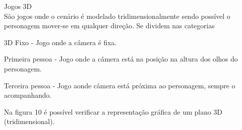 \begin{figure}[h!]
		\centering
	\end{figure}
	\pagebreak
\begin{alineascomponto}

\item Jogos 3D\\
São jogos onde o cenário é modelado tridimensionalmente sendo possível o personagem mover-se em qualquer direção.
Se dividem nas categorias
\begin{alineascomponto}
\item 3D Fixo - Jogo onde a câmera é fixa.
\item Primeira pessoa - Jogo onde a câmera está na posição na altura dos olhos do personagem.
\item Terceira pessoa - Jogo aonde câmera está próxima ao personagem, sempre o acompanhando. 
\end{alineascomponto}
Na figura 10 é possível verificar a representação gráfica de um plano 3D (tridimensional).
\end{alineascomponto}

\pagebreak
\begin{figure}[h!]
		\centering
	\end{figure}
	
